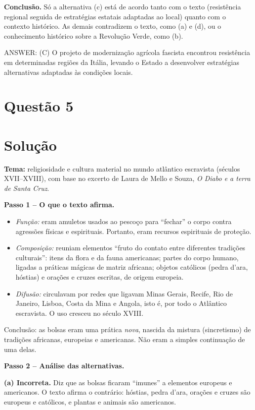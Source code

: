 \documentclass{article}%
\begin{document}
\textbf{Conclusão.} Só a alternativa (c) está de acordo tanto com o texto (resistência regional seguida de estratégias estatais adaptadas ao local) quanto com o contexto histórico. As demais contradizem o texto, como (a) e (d), ou o conhecimento histórico sobre a Revolução Verde, como (b).

ANSWER: (C) O projeto de modernização agrícola fascista encontrou resistência em determinadas regiões da Itália, levando o Estado a desenvolver estratégias alternativas adaptadas às condições locais.%
\newpage%
\section*{Questão 5}

\section*{Solução}

\textbf{Tema:} religiosidade e cultura material no mundo atlântico escravista (séculos XVII--XVIII), com base no excerto de Laura de Mello e Souza, \emph{O Diabo e a terra de Santa Cruz}.

\textbf{Passo 1 -- O que o texto afirma.}
\begin{itemize}
\item \emph{Função:} eram amuletos usados ao pescoço para ``fechar'' o corpo contra agressões físicas e espirituais. Portanto, eram recursos espirituais de proteção.
\item \emph{Composição:} reuniam elementos ``fruto do contato entre diferentes tradições culturais'': itens da flora e da fauna americanas; partes do corpo humano, ligadas a práticas mágicas de matriz africana; objetos católicos (pedra d'ara, hóstias) e orações e cruzes escritas, de origem europeia.
\item \emph{Difusão:} circulavam por redes que ligavam Minas Gerais, Recife, Rio de Janeiro, Lisboa, Costa da Mina e Angola, isto é, por todo o Atlântico escravista. O uso cresceu no século XVIII.
\end{itemize}
Conclusão: as bolsas eram uma prática \emph{nova}, nascida da mistura (sincretismo) de tradições africanas, europeias e americanas. Não eram a simples continuação de uma delas.

\textbf{Passo 2 -- Análise das alternativas.}

\textbf{(a) Incorreta.} Diz que as bolsas ficaram ``imunes'' a elementos europeus e americanos. O texto afirma o contrário: hóstias, pedra d'ara, orações e cruzes são europeus e católicos, e plantas e animais são americanos.
\end{document}
